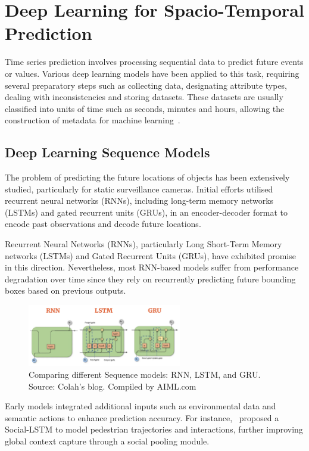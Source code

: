 \documentclass[12pt,oneside]{book} %
\begin{document}
\newpage
\section{Deep Learning for Spacio-Temporal Prediction}
Time series prediction involves processing sequential data to predict future
events or values. Various deep learning models have been applied to this task,
requiring several preparatory steps such as collecting data, designating
attribute types, dealing with inconsistencies and storing datasets. These
datasets are usually classified into units of time such as seconds, minutes and
hours, allowing the construction of metadata for machine
learning~\cite{FFPSpaceSystemVehicles}.

\subsection*{Deep Learning Sequence Models}
The problem of predicting the future locations of objects has been extensively
studied, particularly for static surveillance cameras. Initial efforts utilised
recurrent neural networks (RNNs), including long-term memory networks (LSTMs)
and gated recurrent units (GRUs), in an encoder-decoder format to encode past
observations and decode future locations. 

Recurrent Neural Networks (RNNs), particularly Long Short-Term Memory networks
(LSTMs) and Gated Recurrent Units (GRUs), have exhibited promise in this
direction. Nevertheless, most RNN-based models suffer from performance
degradation over time since they rely on recurrently predicting future bounding
boxes based on previous outputs. 

\begin{figure}[H]
    \centering
    \includegraphics[width=0.6\textwidth]{figures/lstm-rnn-gru.png}
    \caption{Comparing different Sequence models: RNN, LSTM, and GRU. Source: Colah's blog. Compiled by AIML.com}\label{fig:lstm-rnn-gru}
\end{figure}

Early models integrated additional inputs such as environmental data and
semantic actions to enhance prediction accuracy. For
instance,~\citet{Alahi2016} proposed a Social-LSTM to model pedestrian
trajectories and interactions, further improving global context capture through
a social pooling module.
\end{document}
